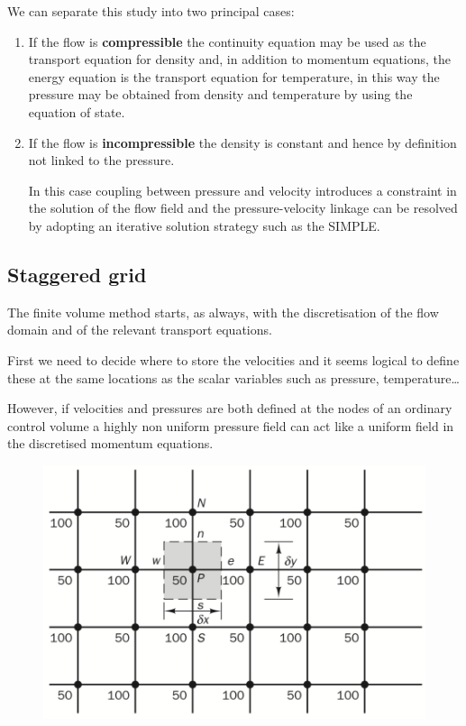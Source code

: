 \documentclass[a4paper, 15pt]{article}
\begin{document}
We can separate this study into two principal cases: 
\begin{enumerate}
	\item If
	the flow is \textbf{compressible} the continuity equation may be used as the transport equation for
	density and, in addition to momentum equations, the energy equation is the transport equation
	for temperature, in this way the
	pressure may be obtained from density and temperature by using the equation of state. 
	
	\item If the flow is \textbf{incompressible} the density is constant and hence by definition not linked
	to the pressure. \newline 
	
	In
	this case coupling between pressure and velocity introduces a constraint in the solution of the
	flow field and the pressure-velocity linkage can be resolved by adopting an iterative solution strategy such as the SIMPLE. 
\end{enumerate}

\subsection{Staggered grid}

The
finite volume method starts, as always, with the discretisation of the flow domain and of the
relevant transport equations. \newline 

First
we need to decide where to store the velocities and it seems logical to define these at the same
locations as the scalar variables such as pressure, temperature\dots

However,
if velocities and pressures are both defined at the nodes of an ordinary control volume
a highly non uniform pressure field can act like a uniform field in the discretised momentum
equations. 
\begin{figure}[H]
	\centering
	\includegraphics[width=0.5\linewidth]{fig/screenshot020}
	\label{fig:screenshot020}
\end{figure}
\end{document}
